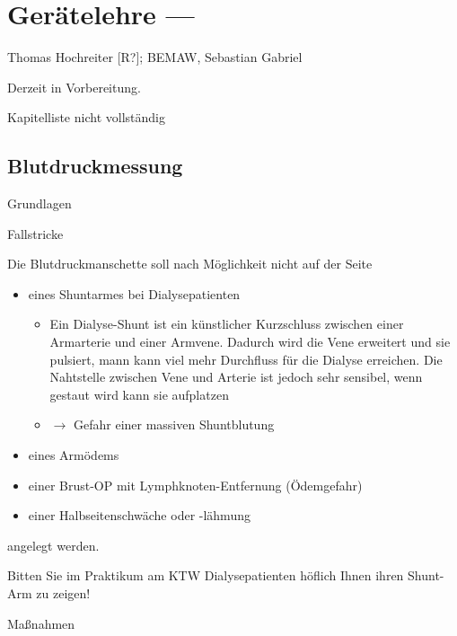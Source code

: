 \chapter{Gerätelehre --- }

Thomas Hochreiter [R?]; BEMAW, Sebastian Gabriel

Derzeit in Vorbereitung. 

Kapitelliste nicht vollst\"andig

\section{Blutdruckmessung}

\label{topic:rr-messung}

Grundlagen

Fallstricke

Die Blutdruckmanschette soll nach M\"oglichkeit nicht auf der Seite

\begin{itemize}
    \item eines Shuntarmes bei Dialysepatienten
    \begin{itemize}
        \item Ein Dialyse-Shunt ist ein k\"unstlicher Kurzschluss zwischen einer
        Armarterie und einer Armvene. Dadurch wird die Vene erweitert und sie
        pulsiert, mann kann viel mehr Durchfluss f\"ur die Dialyse erreichen.
        Die Nahtstelle zwischen Vene und Arterie ist jedoch sehr sensibel, wenn
        gestaut wird kann sie aufplatzen 
        \item ${\rightarrow}$ Gefahr einer massiven Shuntblutung
    \end{itemize}
    \item eines Arm\"odems
    \item einer Brust-OP mit Lymphknoten-Entfernung (\"Odemgefahr)
    \item einer Halbseitenschw\"ache oder -l\"ahmung
\end{itemize}

angelegt werden. 


Bitten Sie im Praktikum am KTW Dialysepatienten h\"oflich Ihnen ihren
Shunt-Arm zu zeigen!

Ma{\ss}nahmen

